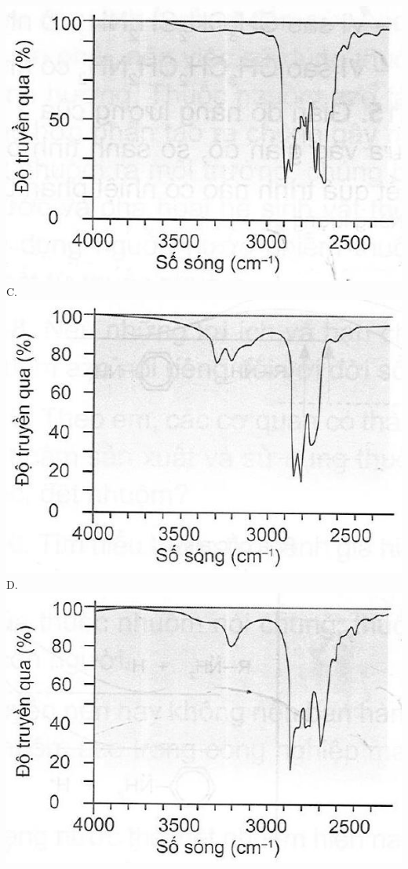 \documentclass[10pt]{article}
\begin{document}
\includegraphics[max width=\textwidth, center]{2025_10_23_de6f5713836e4e91b3c8g-047(1)}\\
C.\\
\includegraphics[max width=\textwidth, center]{2025_10_23_de6f5713836e4e91b3c8g-047}\\
D.\\
\includegraphics[max width=\textwidth, center]{2025_10_23_de6f5713836e4e91b3c8g-047(2)}
\end{document}
